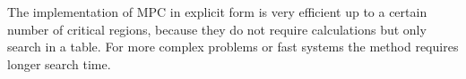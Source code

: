 The implementation of MPC in explicit form is very efficient up to a certain number of critical regions, because they do not require calculations but only search in a table. For more complex problems or fast systems the method requires longer search time.

%
%
